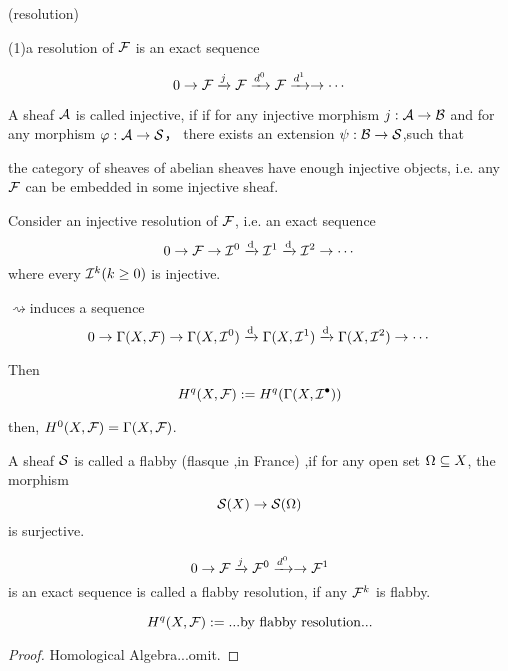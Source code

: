 \begin{definition}  (resolution)

(1)a resolution of $\mathcal{F}$ is an exact sequence

$$0\to \mathcal{F}\xrightarrow{j}\mathcal{F}\xrightarrow{d^0}\mathcal{F}\xrightarrow{d^1}\to\cdots$$

\end{definition}

\begin{definition}
A sheaf $\mathcal{A}$ is called injective, if
if for any injective morphism $j:\mathcal{A}\to \mathcal{B}$
and for any morphism $\varphi:\mathcal{A}\to\mathcal{S}$，
there exists an extension $\psi :\mathcal{B}\to \mathcal{S}$,such that
\end{definition}
\begin{thm}
the category of sheaves of abelian sheaves have enough
injective objects, i.e.  any $\mathcal{F}$ can be
embedded in some injective sheaf.
\end{thm}

\begin{definition}
Consider an injective resolution of $\mathcal{F}$, i.e. an exact sequence
$$0\to\mathcal{F}\to\mathcal{I}^0\xrightarrow{\mathrm{d}}\mathcal{I}^1\xrightarrow{\mathrm{d}}\mathcal{I}^2\to\cdots$$
where every $\mathcal{I}^k(k\geq 0)$ is injective.


$\rightsquigarrow $induces a sequence
$$0\to\Gamma(X,\mathcal{F})
\to\Gamma(X,\mathcal{I}^0)\xrightarrow{\mathrm{d}}
\Gamma(X,\mathcal{I}^1)\xrightarrow{\mathrm{d}}
\Gamma(X,\mathcal{I}^2)\to\cdots$$

Then
$$H^q(X,\mathcal{F}):=H^q(\Gamma(X,\mathcal{I}^{\bullet}))$$

\end{definition}

then, $H^0(X,\mathcal{F})=\Gamma(X,\mathcal{F})$.

\begin{definition}
A sheaf $\mathcal{S}$ is called a flabby (flasque ,in France) ,if
for any open set $\Omega\subseteq X$, the morphism
$$\mathcal{S}(X)\to\mathcal{S}(\Omega)$$
is surjective.
\end{definition}

\begin{definition}
$$0\to\mathcal{F}\xrightarrow{j}\mathcal{F}^0\xrightarrow{d^0}\to\mathcal{F}^1$$
is an exact sequence is called a flabby resolution, if
any $\mathcal{F}^k$ is flabby.
\end{definition}

\begin{definition}
$$H^q(X,\mathcal{F}):=...\text{by flabby resolution...}$$
\end{definition}

\begin{proof}
Homological Algebra...omit.
\end{proof}

